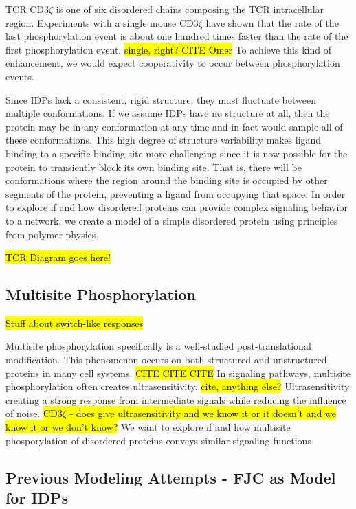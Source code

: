 \documentclass[../AdvancementSummary.tex]{subfiles}
\begin{document}
TCR CD3$\zeta$ is one of six disordered chains composing the TCR intracellular region. Experiments with a single mouse CD3$\zeta$ have shown that the rate of the last phosphorylation event is about one hundred times faster than the rate of the first phosphorylation event. \hl{single, right? CITE Omer} To achieve this kind of enhancement, we would expect cooperativity to occur between phosphorylation events. 

Since IDPs lack a consistent, rigid structure, they must fluctuate between multiple conformations.  If we assume IDPs have no structure at all, then the protein may be in any conformation at any time and in fact would sample all of these conformations.  This high degree of structure variability makes ligand binding to a specific binding site more challenging since it is now possible for the protein to transiently block its own binding site. That is, there will be conformations where the region around the binding site is occupied by other segments of the protein, preventing a ligand from occupying that space. In order to explore if and how disordered proteins can provide complex signaling behavior to a network, we create a model of a simple disordered protein using principles from polymer physics.


\hl{TCR Diagram goes here!}


\subsection{Multisite Phosphorylation}

\hl{Stuff about switch-like responses}

Multisite phosphorylation specifically is a well-studied post-translational modification.  This phenomenon occurs on both structured and unstructured proteins in many cell systems. \hl{CITE CITE CITE} In signaling pathways, multisite phosphorylation often creates ultrasensitivity. \hl{cite, anything else?} Ultrasensitivity creating a strong response from intermediate signals while reducing the influence of noise. \hl{CD3$\zeta$ - does give ultrasensitivity and we know it or it doesn't and we know it or we don't know?} We want to explore if and how multisite phosporylation of disordered proteins conveys similar signaling functions.



\subsection{Previous Modeling Attempts - FJC as Model for IDPs}
\end{document}
